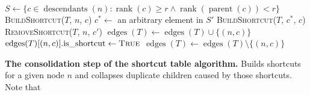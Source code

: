 \begin{algorithm}[h]
  \begin{algorithmic}[1]
  \small{
      \State $S \gets \{c \in \operatorname{descendants}(n) : \operatorname{rank}(c) \ge r \land  \operatorname{rank}(\operatorname{parent}(c)) < r\}$ 
        \textsc{BuildShortcut}($T$, $n$, $c$)
      \EndFor
        \State $c^* \gets$ an arbitrary element in $S'$ 
            \State \textsc{BuildShortcut}($T$, $c^*$, $c$)
          \EndFor
          \State \textsc{RemoveShortcut}($T$, $n$, $c'$)
        \EndFor
      \EndFor 
    \EndFunction
      \State $\operatorname{edges}(T) \gets \operatorname{edges}(T) \cup \{(n, c)\}$
      \State $\operatorname{edges}(T)[(n, c)]\text{.is\_shortcut} \gets \textsc{True}$
    \EndFunction
        \State $\operatorname{edges}(T) \gets \operatorname{edges}(T) \setminus \{(n, c)\}$
    \EndFunction
  }
  \end{algorithmic}
  \caption{\textbf{The consolidation step of the shortcut table algorithm.} \small Builds shortcuts for a given node $n$ and collapses duplicate children caused by those shortcuts. Note that \vspace{-1.5em}}
  \label{alg:consolidation}
\end{algorithm}
